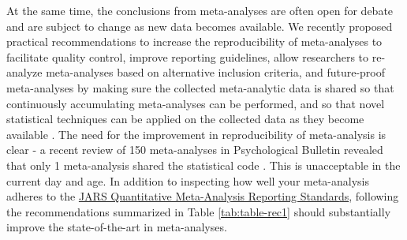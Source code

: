 \documentclass[
  oneside]{book}
\begin{document}
At the same time, the conclusions from meta-analyses are often open for debate and are subject to change as new data becomes available. We recently proposed practical recommendations to increase the reproducibility of meta-analyses to facilitate quality control, improve reporting guidelines, allow researchers to re-analyze meta-analyses based on alternative inclusion criteria, and future-proof meta-analyses by making sure the collected meta-analytic data is shared so that continuously accumulating meta-analyses can be performed, and so that novel statistical techniques can be applied on the collected data as they become available \citep{lakens_reproducibility_2016}. The need for the improvement in reproducibility of meta-analysis is clear - a recent review of 150 meta-analyses in Psychological Bulletin revealed that only 1 meta-analysis shared the statistical code \citep{polanin_transparency_2020}. This is unacceptable in the current day and age. In addition to inspecting how well your meta-analysis adheres to the \href{https://apastyle.apa.org/jars/quant-table-9.pdf}{JARS Quantitative Meta-Analysis Reporting Standards}, following the recommendations summarized in Table \ref{tab:table-rec1} should substantially improve the state-of-the-art in meta-analyses.
\end{document}
